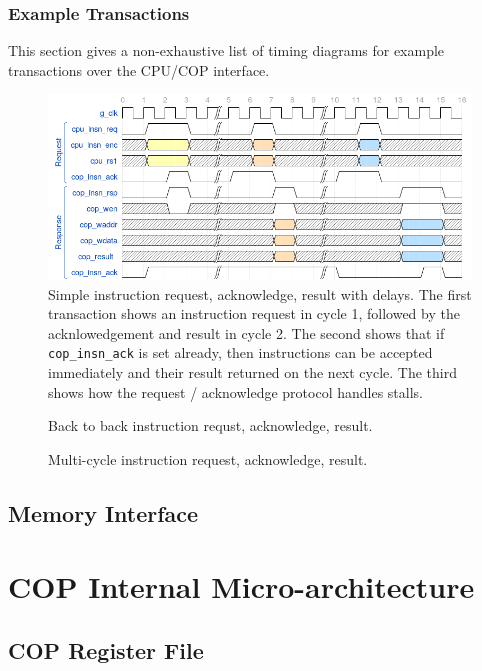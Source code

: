 \documentclass{article}
\begin{document}
\subsubsection{Example Transactions}

This section gives a non-exhaustive list of timing diagrams for example
transactions over the CPU/COP interface.

\begin{figure}[h]
\centering
\includegraphics[width=\textwidth]{./diagrams/cpu-cop-if-1.png}
\caption{Simple instruction request, acknowledge, result with delays.
The first transaction shows an instruction request in cycle 1, followed
by the acknlowedgement and result in cycle 2.
The second shows that if {\tt cop\_insn\_ack} is set already, then
instructions can be accepted immediately and their result returned on the next
cycle.  The third shows how the request / acknowledge protocol handles
stalls.}
\end{figure}

\begin{figure}[h]
\caption{Back to back instruction requst, acknowledge, result.}
\end{figure}

\begin{figure}[h]
\caption{Multi-cycle instruction request, acknowledge, result.}
\end{figure}

\subsection{Memory Interface}


\section{COP Internal Micro-architecture}
\label{sec:cop-microarch}

\subsection{COP Register File}
\end{document}
